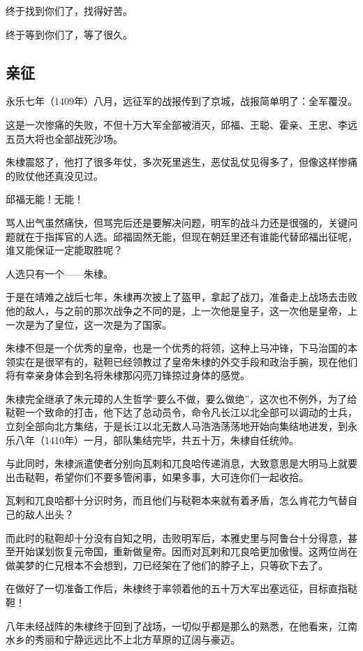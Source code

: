 \begin{multicols}{\theparacolNo}
终于找到你们了，找得好苦。

终于等到你们了，等了很久。

\subsection{亲征}
永乐七年（1409年）八月，远征军的战报传到了京城，战报简单明了：全军覆没。

这是一次惨痛的失败，不但十万大军全部被消灭，邱福、王聪、霍亲、王忠、李远五员大将也全部战死沙场。

朱棣震怒了，他打了很多年仗，多次死里逃生，恶仗乱仗见得多了，但像这样惨痛的败仗他还真没见过。

邱福无能！无能！

骂人出气虽然痛快，但骂完后还是要解决问题，明军的战斗力还是很强的，关键问题就在于指挥官的人选。邱福固然无能，但现在朝廷里还有谁能代替邱福出征呢，谁又能保证一定能取胜呢？

人选只有一个——朱棣。

于是在靖难之战后七年，朱棣再次披上了盔甲，拿起了战刀，准备走上战场去击败他的敌人，与之前的那次战争之不同的是，上一次他是皇子，这一次他是皇帝，上一次是为了皇位，这一次是为了国家。

朱棣不但是一个优秀的皇帝，也是一个优秀的将领，这种上马冲锋，下马治国的本领实在是很罕有的，鞑靼已经领教过了皇帝朱棣的外交手段和政治手腕，现在他们将有幸亲身体会到名将朱棣那闪亮刀锋掠过身体的感觉。

朱棣完全继承了朱元璋的人生哲学“要么不做，要么做绝”，这次也不例外，为了给鞑靼一个致命的打击，他下达了总动员令，命令凡长江以北全部可以调动的士兵，立刻全部向北方集结，于是长江以北无数人马浩浩荡荡地开始向集结地进发，到永乐八年（1410年）一月，部队集结完毕，共五十万，朱棣自任统帅。

与此同时，朱棣派遣使者分别向瓦剌和兀良哈传递消息，大致意思是大明马上就要出击鞑靼，希望你们不要多管闲事，如果多事，大可连你们一起收拾。

瓦剌和兀良哈都十分识时务，而且他们与鞑靼本来就有着矛盾，怎么肯花力气替自己的敌人出头？

而此时的鞑靼却十分没有自知之明，击败明军后，本雅史里与阿鲁台十分得意，甚至开始谋划恢复元帝国，重新做皇帝。因而对瓦剌和兀良哈更加傲慢。这两位尚在做美梦的仁兄根本不会想到，刀已经架在了他们的脖子上，只等砍下去了。

在做好了一切准备工作后，朱棣终于率领着他的五十万大军出塞远征，目标直指鞑靼！

八年未经战阵的朱棣终于回到了战场，一切似乎都是那么的熟悉，在他看来，江南水乡的秀丽和宁静远远比不上北方草原的辽阔与豪迈。


\end{multicols}
